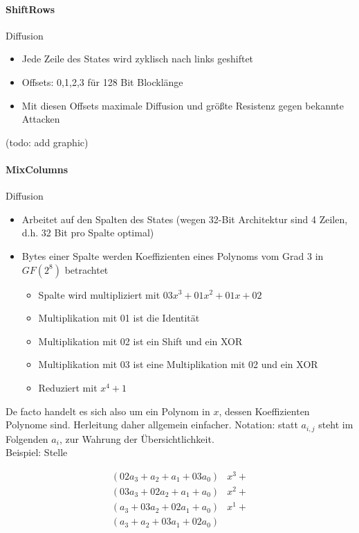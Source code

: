 \paragraph{ShiftRows}

Diffusion
\begin{itemize}
    \item Jede Zeile des States wird zyklisch nach links geshiftet
    \item Offsets: 0,1,2,3 für 128 Bit Blocklänge
    \item Mit diesen Offsets maximale Diffusion und größte Resistenz gegen bekannte Attacken
\end{itemize}

(todo: add graphic)

\paragraph{MixColumns}

Diffusion
\begin{itemize}
    \item Arbeitet auf den Spalten des States (wegen 32-Bit Architektur sind 4 Zeilen, d.h. 32 Bit pro Spalte optimal)
    \item Bytes einer Spalte werden Koeffizienten eines Polynoms vom Grad 3 in $GF(2^8)$ betrachtet
    \begin{itemize}
        \item Spalte wird multipliziert mit $03x^3 + 01x^2 + 01x + 02$
        \item Multiplikation mit 01 ist die Identität 
        \item Multiplikation mit 02 ist ein Shift und ein XOR 
        \item Multiplikation mit 03 ist eine Multiplikation mit 02 und ein XOR 
        \item Reduziert mit $x^4 + 1$ 
    \end{itemize}
\end{itemize}

De facto handelt es sich also um ein Polynom in $x$, dessen Koeffizienten Polynome sind. Herleitung daher allgemein einfacher.
Notation: statt $a_{i,j}$ steht im Folgenden $a_i$, zur Wahrung der Übersichtlichkeit. \\

Beispiel: Stelle 

\begin{align*}
    (02a_3+a_2+a_1+03a_0)&x^3 + \\
    (03a_3+02a_2+a_1+a_0)&x^2 + \\
    (a_3+03a_2+02a_1+a_0)&x^1 + \\ 
    (a_3+a_2+03a_1+02a_0)& 
\end{align*}
    
